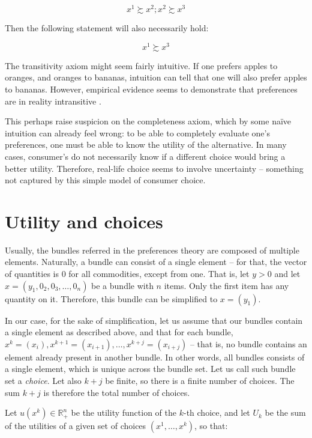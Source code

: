 \documentclass[12pt, letterpaper]{article}
\begin{document}
	\begin{equation}
		x^1 \succsim x^2; x^2 \succsim x^3
	\end{equation}

	Then the following statement will also necessarily hold:

	\begin{equation}
		x^1 \succsim x^3
	\end{equation}

	The transitivity axiom might seem fairly intuitive. If one prefers apples to oranges, and oranges to bananas, intuition can tell that one will also prefer apples to bananas. However, empirical evidence seems to demonstrate that preferences are in reality intransitive \cite{GUADALUPELANAS2020e03459}. 
	
	This perhaps raise suspicion on the completeness axiom, which by some naïve intuition can already feel wrong: to be able to completely evaluate one's preferences, one must be able to know the utility of the alternative. In many cases, consumer's do not necessarily know if a different choice would bring a better utility. Therefore, real-life choice seems to involve uncertainty -- something not captured by this simple model of consumer choice.

	\section{Utility and choices}
	Usually, the bundles referred in the preferences theory are composed of multiple elements. Naturally, a bundle can consist of a single element -- for that, the vector of quantities is $0$ for all commodities, except from one. That is, let  $y > 0$ and let $x = (y_1, 0_{2}, 0_{3}, \dots, 0_n)$ be a bundle with $n$ items. Only the first item has any quantity on it. Therefore, this bundle can be simplified to $x = (y_1)$.  
		
	In our case, for the sake of simplification, let us assume that our bundles contain a single element as described above, and that for each bundle, $x^k = (x_i), x^{k+1}= (x_{i+1}), \dots , x^{k+j} = (x_{i+j})$ -- that is, no bundle contains an element already present in another bundle. In other words, all bundles consists of a single element, which is unique across the bundle set. Let us call such bundle set a \textit{choice}. Let also $k+j$ be finite, so there is a finite number of choices. The sum $k+j$ is therefore the total number of choices.
	
	Let $u(x^k) \in \mathbb{R}_+^n$ be the utility function of the $k$-th choice, and let $U_k$ be the sum of the utilities of a given set of choices $(x^1, \dots , x^k)$, so that:
	 
\end{document}
